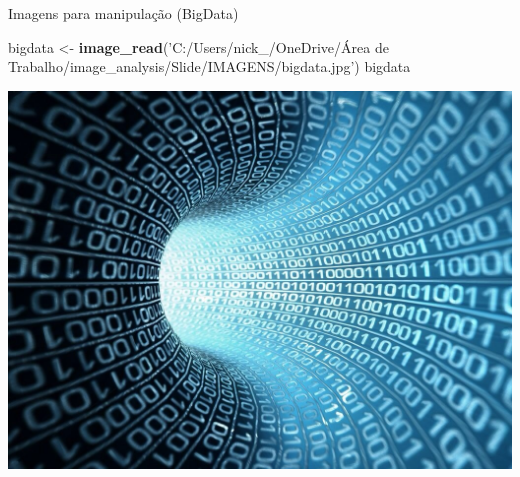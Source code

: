 \documentclass[
  ignorenonframetext,
]{beamer}
\newenvironment{Shaded}{\begin{snugshade}}{\end{snugshade}}
\newcommand{\KeywordTok}[1]{\textcolor[rgb]{0.13,0.29,0.53}{\textbf{#1}}}
\newcommand{\NormalTok}[1]{#1}
\newcommand{\StringTok}[1]{\textcolor[rgb]{0.31,0.60,0.02}{#1}}
\begin{document}
\begin{frame}[fragile]{Imagens para manipulação (BigData)}
\protect\hypertarget{imagens-para-manipulauxe7uxe3o-bigdata}{}

\begin{Shaded}
\begin{Highlighting}[]
\NormalTok{bigdata <-}\StringTok{ }\KeywordTok{image_read}\NormalTok{(}\StringTok{'C:/Users/nick_/OneDrive/Área de Trabalho/image_analysis/Slide/IMAGENS/bigdata.jpg'}\NormalTok{)}
\NormalTok{bigdata}
\end{Highlighting}
\end{Shaded}

\includegraphics[width=14.22in]{SLIDES_files/figure-beamer/5.1.1-1}

\end{frame}
\end{document}
